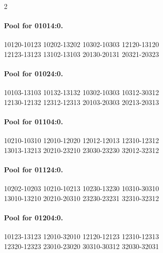 \documentclass[11pt]{article}
\numberwithin{equation}{section}
\numberwithin{table}{section}
\begin{document}
\begin{multicols}{2}
\paragraph{Pool for 01014:0.}
\begingroup\footnotesize\ttfamily\begin{flushleft}
10120-10123 10202-13202 10302-10303 12120-13120\\
12123-13123 13102-13103 20130-20131 20321-20323\\
\end{flushleft}\endgroup
\paragraph{Pool for 01024:0.}
\begingroup\footnotesize\ttfamily\begin{flushleft}
10103-13103 10132-13132 10302-10303 10312-30312\\
12130-12132 12312-12313 20103-20303 20213-20313\\
\end{flushleft}\endgroup
\paragraph{Pool for 01104:0.}
\begingroup\footnotesize\ttfamily\begin{flushleft}
10210-10310 12010-12020 12012-12013 12310-12312\\
13013-13213 20210-23210 23030-23230 32012-32312\\
\end{flushleft}\endgroup
\paragraph{Pool for 01124:0.}
\begingroup\footnotesize\ttfamily\begin{flushleft}
10202-10203 10210-10213 10230-13230 10310-30310\\
13010-13210 20210-20310 23230-23231 32310-32312\\
\end{flushleft}\endgroup
\paragraph{Pool for 01204:0.}
\begingroup\footnotesize\ttfamily\begin{flushleft}
10123-13123 12010-32010 12120-12123 12310-12313\\
12320-12323 23010-23020 30310-30312 32030-32031\\
\end{flushleft}\endgroup

\end{multicols}
\end{document}
